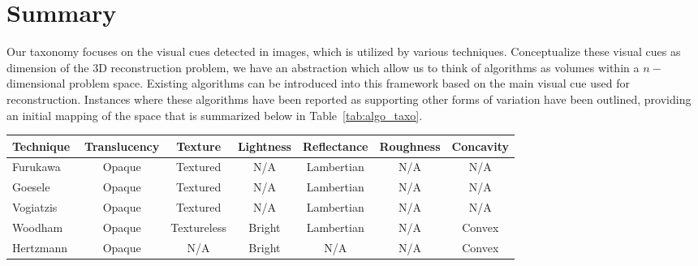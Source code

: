 \section{Summary}
Our taxonomy focuses on the visual cues detected in images, which is utilized by various techniques. Conceptualize these visual cues as dimension of the 3D reconstruction problem, we have an abstraction which allow us to think of algorithms as volumes within a $n-$dimensional problem space. Existing algorithms can be introduced into this framework based on the main visual cue used for reconstruction. Instances where these algorithms have been reported as supporting other forms of variation have been outlined, providing an initial mapping of the space that is summarized below in Table~\ref{tab:algo_taxo}.
\begin{sidewaystable}[h]
  \centering
  \begin{tabular}{l*{6}{c}}
  \hline
  \textbf{Technique} & Translucency & Texture & Lightness & Reflectance & Roughness & Concavity\\
  \hline
  Furukawa~\cite{furukawa2010accurate} & Opaque & Textured & N/A & Lambertian & N/A & N/A\\
  Goesele~\cite{goesele2006multi} & Opaque & Textured & N/A & Lambertian & N/A & N/A\\
  Vogiatzis~\cite{vogiatzis2007multiview} & Opaque & Textured & N/A & Lambertian & N/A & N/A\\
  Woodham~\cite{woodham1980photometric} & Opaque & Textureless & Bright & Lambertian & N/A & Convex\\
  Hertzmann~\cite{hertzmann2005example} & Opaque & N/A & Bright & N/A & N/A & Convex\\
  \hline
  \end{tabular}
  \caption{Algorithm classification based on the new taxonomy}
  \label{tab:algo_taxo}
\end{sidewaystable}
